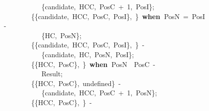 \documentclass[runningheads,a4paper]{llncs}
\newcommand{\hlstd}[1]{\textcolor[rgb]{0,0,0}{#1}}
\newcommand{\hlnum}[1]{\textcolor[rgb]{0.69,0.49,0}{#1}}
\newcommand{\hlopt}[1]{\textcolor[rgb]{0,0,0}{#1}}
\newcommand{\hlkwa}[1]{\textcolor[rgb]{0,0,0}{\bf{#1}}}
\begin{document}
\begin{figure}
\hlstd{}\hlstd{\ \ \ \ \ \ \ \ \ \ \ \ }\hlstd{}\hlopt{\{}\hlstd{candidate}\hlopt{,\ }\hlstd{HCC}\hlopt{,\ }\hlstd{PosC\ }\hlopt{+\ }\hlstd{}\hlnum{1}\hlstd{}\hlopt{,\ }\hlstd{PosI}\hlopt{\};}\hspace*{\fill}\\
\hlstd{}\hlstd{\ \ \ \ \ \ \ \ \ }\hlstd{}\hlopt{\{\{}\hlstd{candidate}\hlopt{,\ }\hlstd{\textunderscore HCC}\hlopt{,\ }\hlstd{\textunderscore PosC}\hlopt{,\ }\hlstd{PosI}\hlopt{\},\ }\hlstd{\textunderscore }\hlopt{\}\ }\hlstd{}\hlkwa{when\ }\hlstd{PosN\ }\hlopt{=\ }\hlstd{PosI\ }\hlopt{{-}}\hspace*{\fill}\\
\hlstd{}\hlstd{\ \ \ \ \ \ \ \ \ \ \ \ }\hlstd{}\hlopt{\{}\hlstd{HC}\hlopt{,\ }\hlstd{PosN}\hlopt{\};}\hspace*{\fill}\\
\hlstd{}\hlstd{\ \ \ \ \ \ \ \ \ }\hlstd{}\hlopt{\{\{}\hlstd{candidate}\hlopt{,\ }\hlstd{\textunderscore HCC}\hlopt{,\ }\hlstd{\textunderscore PosC}\hlopt{,\ }\hlstd{PosI}\hlopt{\},\ }\hlstd{\textunderscore }\hlopt{\}\ {-}}\hspace*{\fill}\\
\hlstd{}\hlstd{\ \ \ \ \ \ \ \ \ \ \ \ }\hlstd{}\hlopt{\{}\hlstd{candidate}\hlopt{,\ }\hlstd{HC}\hlopt{,\ }\hlstd{PosN}\hlopt{,\ }\hlstd{PosI}\hlopt{\};}\hspace*{\fill}\\
\hlstd{}\hlstd{\ \ \ \ \ \ \ \ \ }\hlstd{}\hlopt{\{\{}\hlstd{\textunderscore HCC}\hlopt{,\ }\hlstd{PosC}\hlopt{\},\ }\hlstd{\textunderscore }\hlopt{\}\ }\hlstd{}\hlkwa{when\ }\hlstd{PosN\ }\hlopt{\ }\hlstd{PosC\ }\hlopt{{-}}\hspace*{\fill}\\
\hlstd{}\hlstd{\ \ \ \ \ \ \ \ \ \ \ \ }\hlstd{Result}\hlopt{;}\hspace*{\fill}\\
\hlstd{}\hlstd{\ \ \ \ \ \ \ \ \ }\hlstd{}\hlopt{\{\{}\hlstd{HCC}\hlopt{,\ }\hlstd{PosC}\hlopt{\},\ }\hlstd{undefined}\hlopt{\}\ {-}}\hspace*{\fill}\\
\hlstd{}\hlstd{\ \ \ \ \ \ \ \ \ \ \ \ }\hlstd{}\hlopt{\{}\hlstd{candidate}\hlopt{,\ }\hlstd{HCC}\hlopt{,\ }\hlstd{PosC\ }\hlopt{+\ }\hlstd{}\hlnum{1}\hlstd{}\hlopt{,\ }\hlstd{PosN}\hlopt{\};}\hspace*{\fill}\\
\hlstd{}\hlstd{\ \ \ \ \ \ \ \ \ }\hlstd{}\hlopt{\{\{}\hlstd{\textunderscore HCC}\hlopt{,\ }\hlstd{\textunderscore PosC}\hlopt{\},\ }\hlstd{\textunderscore }\hlopt{\}\ {-}}\hspace*{\fill}\\

\end{figure}
\end{document}
